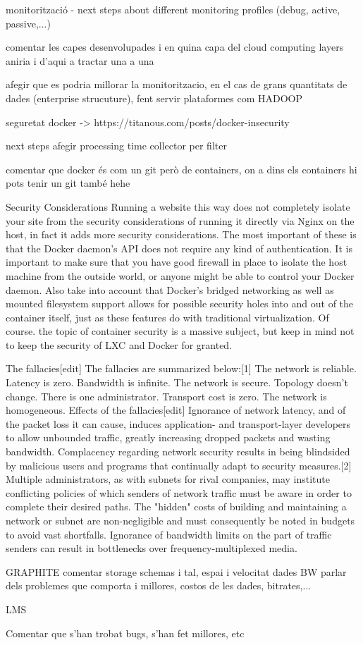 monitorització - next steps about different monitoring profiles (debug, active, passive,...)

comentar les capes desenvolupades i en quina capa del cloud computing layers aniria i d'aqui a tractar una a una

afegir que es podria millorar la monitoritzacio, en el cas de grans quantitats de dades (enterprise strucuture), fent servir plataformes com HADOOP

seguretat docker -> https://titanous.com/posts/docker-insecurity

next steps afegir processing time collector per filter


comentar que docker és com un git però de containers, on a dins els containers hi pots tenir un git també hehe

Security Considerations
Running a website this way does not completely isolate your site from the security considerations of running it directly via Nginx on the host, in fact it adds more security considerations. The most important of these is that the Docker daemon’s API does not require any kind of authentication. It is important to make sure that you have good firewall in place to isolate the host machine from the outside world, or anyone might be able to control your Docker daemon. Also take into account that Docker’s bridged networking as well as mounted filesystem support allows for possible security holes into and out of the container itself, just as these features do with traditional virtualization. Of course. the topic of container security is a massive subject, but keep in mind not to keep the security of LXC and Docker for granted.

The fallacies[edit]
The fallacies are summarized below:[1]
The network is reliable.
Latency is zero.
Bandwidth is infinite.
The network is secure.
Topology doesn't change.
There is one administrator.
Transport cost is zero.
The network is homogeneous.
Effects of the fallacies[edit]
Ignorance of network latency, and of the packet loss it can cause, induces application- and transport-layer developers to allow unbounded traffic, greatly increasing dropped packets and wasting bandwidth.
Complacency regarding network security results in being blindsided by malicious users and programs that continually adapt to security measures.[2]
Multiple administrators, as with subnets for rival companies, may institute conflicting policies of which senders of network traffic must be aware in order to complete their desired paths.
The "hidden" costs of building and maintaining a network or subnet are non-negligible and must consequently be noted in budgets to avoid vast shortfalls.
Ignorance of bandwidth limits on the part of traffic senders can result in bottlenecks over frequency-multiplexed media.


GRAPHITE
comentar storage schemas i tal, espai i velocitat dades BW
parlar dels problemes que comporta i millores, costos de les dades, bitrates,...


LMS

Comentar que s'han trobat bugs, s'han fet millores, etc